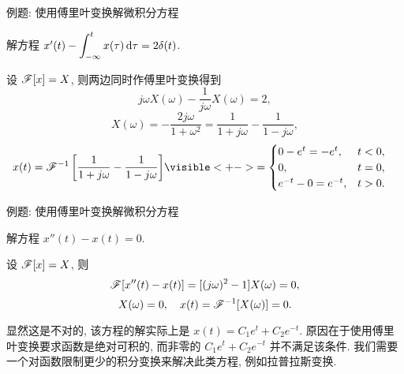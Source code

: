 \begin{frame}{例题: 使用傅里叶变换解微积分方程}
\beqskip{0pt}
\begin{example}
解方程 $x'(t)-\displaystyle\int_{-\infty}^t x(\tau)\,\mathrm{d} \tau=2\delta(t)$.
\end{example}
\begin{solution}
设 $\mathscr{F}[x]=X$, 则两边同时作傅里叶变换得到
\onslide<+->
\[j\omega X(\omega)-\frac1{j\omega}X(\omega)=2,\]
\onslide<+->
\[X(\omega)=-\frac{2j\omega}{1+\omega^2}=\frac1{1+j\omega}-\frac1{1-j\omega},\]
\onslide<+->
\begin{align*}
x(t)=\msf^{-1}\left[\frac1{1+j\omega}-\frac1{1-j\omega}\right]
&\visible<+->{=\begin{cases}
0-e^t=-e^t,&t<0,\\
0,&t=0,\\
e^{-t}-0=e^{-t},&t>0.
\end{cases}}
\end{align*}
\end{solution}
\vspace{-1pt}
\endgroup
\end{frame}


\begin{frame}{例题: 使用傅里叶变换解微积分方程}
\beqskip{8pt}
\begin{example}
解方程 $x''(t)-x(t)=0$.
\end{example}
\begin{solution}
设 $\mathscr{F}[x]=X$,
\onslide<+->
则
\[\mathscr{F}[x''(t)-x(t)]=[(j\omega)^2-1]X(\omega)=0,\]%
\onslide<+->
\vspace{-\baselineskip}
\[X(\omega)=0,\quad x(t)=\mathscr{F}^{-1}[X(\omega)]=0.\]
\end{solution}
\onslide<+->
显然这是不对的, 该方程的解实际上是 $x(t)=C_1e^t+C_2e^{-t}$.
\onslide<+->
原因在于使用傅里叶变换要求函数是绝对可积的, 而非零的 $C_1e^t+C_2e^{-t}$ 并不满足该条件.
\onslide<+->
我们需要一个对函数限制更少的积分变换来解决此类方程, 例如拉普拉斯变换.
\endgroup
\end{frame}

